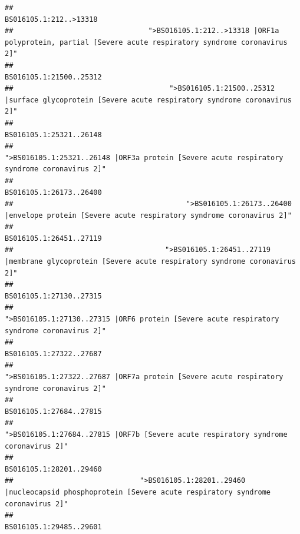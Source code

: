 \documentclass[
]{article}
\begin{document}
\begin{verbatim}
##                                                                                                                 BS016105.1:212..>13318 
##                                ">BS016105.1:212..>13318 |ORF1a polyprotein, partial [Severe acute respiratory syndrome coronavirus 2]" 
##                                                                                                                BS016105.1:21500..25312 
##                                     ">BS016105.1:21500..25312 |surface glycoprotein [Severe acute respiratory syndrome coronavirus 2]" 
##                                                                                                                BS016105.1:25321..26148 
##                                            ">BS016105.1:25321..26148 |ORF3a protein [Severe acute respiratory syndrome coronavirus 2]" 
##                                                                                                                BS016105.1:26173..26400 
##                                         ">BS016105.1:26173..26400 |envelope protein [Severe acute respiratory syndrome coronavirus 2]" 
##                                                                                                                BS016105.1:26451..27119 
##                                    ">BS016105.1:26451..27119 |membrane glycoprotein [Severe acute respiratory syndrome coronavirus 2]" 
##                                                                                                                BS016105.1:27130..27315 
##                                             ">BS016105.1:27130..27315 |ORF6 protein [Severe acute respiratory syndrome coronavirus 2]" 
##                                                                                                                BS016105.1:27322..27687 
##                                            ">BS016105.1:27322..27687 |ORF7a protein [Severe acute respiratory syndrome coronavirus 2]" 
##                                                                                                                BS016105.1:27684..27815 
##                                                    ">BS016105.1:27684..27815 |ORF7b [Severe acute respiratory syndrome coronavirus 2]" 
##                                                                                                                BS016105.1:28201..29460 
##                              ">BS016105.1:28201..29460 |nucleocapsid phosphoprotein [Severe acute respiratory syndrome coronavirus 2]" 
##                                                                                                                BS016105.1:29485..29601 

\end{verbatim}
\end{document}
